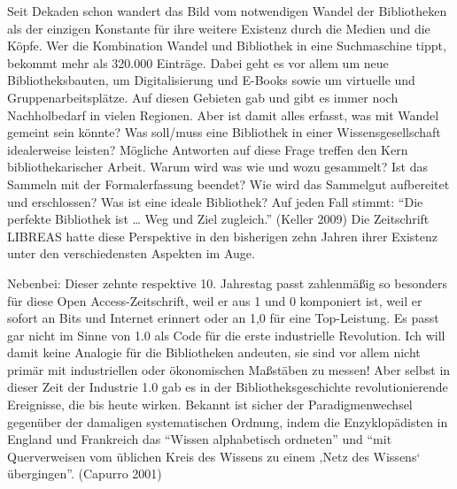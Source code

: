 Seit Dekaden schon wandert das Bild vom notwendigen Wandel der
Bibliotheken als der einzigen Konstante für ihre weitere Existenz durch
die Medien und die Köpfe. Wer die Kombination Wandel und Bibliothek in
eine Suchmaschine tippt, bekommt mehr als 320.000 Einträge. Dabei geht
es vor allem um neue Bibliotheksbauten, um Digitalisierung und E-Books
sowie um virtuelle und Gruppenarbeitsplätze. Auf diesen Gebieten gab und
gibt es immer noch Nachholbedarf in vielen Regionen. Aber ist damit
alles erfasst, was mit Wandel gemeint sein könnte? Was soll/muss eine
Bibliothek in einer Wissensgesellschaft idealerweise leisten? Mögliche
Antworten auf diese Frage treffen den Kern bibliothekarischer Arbeit.
Warum wird was wie und wozu gesammelt? Ist das Sammeln mit der
Formalerfassung beendet? Wie wird das Sammelgut aufbereitet und
erschlossen? Was ist eine ideale Bibliothek? Auf jeden Fall stimmt:
\enquote{Die perfekte Bibliothek ist \ldots{} Weg und Ziel zugleich.}
(Keller 2009) Die Zeitschrift LIBREAS hatte diese Perspektive in den
bisherigen zehn Jahren ihrer Existenz unter den verschiedensten Aspekten
im Auge.

Nebenbei: Dieser zehnte respektive 10. Jahrestag passt zahlenmäßig so
besonders für diese Open Access-Zeitschrift, weil er aus 1 und 0
komponiert ist, weil er sofort an Bits und Internet erinnert oder an 1,0
für eine Top-Leistung. Es passt gar nicht im Sinne von 1.0 als Code für
die erste industrielle Revolution. Ich will damit keine Analogie für die
Bibliotheken andeuten, sie sind vor allem nicht primär mit industriellen
oder ökonomischen Maßstäben zu messen! Aber selbst in dieser Zeit der
Industrie 1.0 gab es in der Bibliotheksgeschichte revolutionierende
Ereignisse, die bis heute wirken. Bekannt ist sicher der
Paradigmenwechsel gegenüber der damaligen systematischen Ordnung, indem
die Enzyklopädisten in England und Frankreich das \enquote{Wissen
alphabetisch ordneten} und \enquote{mit Querverweisen vom üblichen Kreis
des Wissens zu einem ‚Netz des Wissens` übergingen}. (Capurro 2001)

